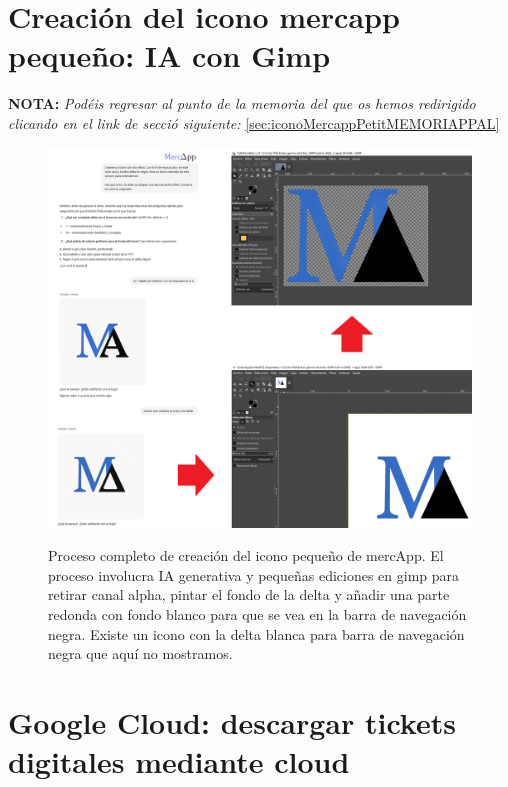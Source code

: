 \documentclass[a4paper,12pt]{report}
\begin{document}
	\pagebreak
	\section{Creación del icono mercapp pequeño: IA con Gimp}
	\label{sec:edicionMercAppIconoPequenyo}
	
	\noindent \textbf{NOTA:} \textit{Podéis regresar al punto de la memoria del que os hemos redirigido clicando en el link de secció siguiente:} \ref{sec:iconoMercappPetitMEMORIAPPAL}
	
	\FloatBarrier
	\setlength{\belowcaptionskip}{3pt}
	\begin{figure}[H]
		\centering
		\caption{Proceso completo de creación del icono pequeño de mercApp. El proceso involucra IA generativa y pequeñas ediciones en gimp para retirar canal alpha, pintar el fondo de la delta y añadir una parte redonda con fondo blanco para que se vea en la barra de navegación negra. Existe un icono con la delta blanca para barra de navegación negra que aquí no mostramos.}
		\includegraphics[width=1\linewidth]{img/edicionMercAppIconoPequenyo.png}
		\label{fig:edicionMercAppIconoPequenyo}
	\end{figure}
	\FloatBarrier
		

	
	
	\section{Google Cloud: descargar tickets digitales mediante cloud}
	\label{sec:googleCloud}
	
\end{document}
